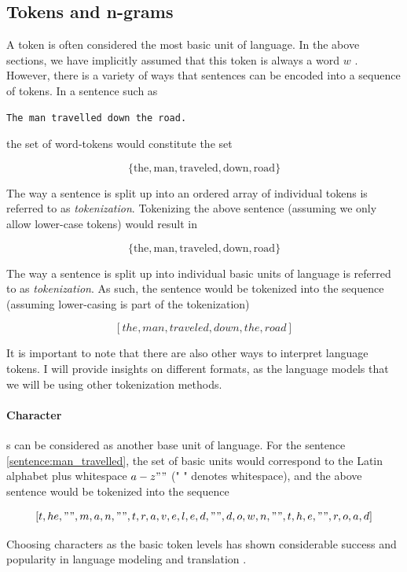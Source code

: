 \documentclass[a4paper,12pt,twoside,openright]{report}
\begin{document}
\subsection{Tokens and n-grams}

A token is often considered the most basic unit of language.
In the above sections, we have implicitly assumed that this token is always a word $w$ . 
However, there is a variety of ways that sentences can be encoded into a sequence of tokens.
In a sentence such as

\begin{verbatim}
The man travelled down the road.
\end{verbatim}\label{sentence:man_travelled}

the set of word-tokens would constitute the set

$$
\{ \text{the}, \text{man}, \text{traveled}, \text{down}, \text{road} \}
$$

The way a sentence is split up into an ordered array of individual tokens is referred to as \textit{tokenization}.
Tokenizing the above sentence (assuming we only allow lower-case tokens) would result in 

$$
\{ \text{the}, \text{man}, \text{traveled}, \text{down}, \text{road} \}
$$

The way a sentence is split up into individual basic units of language is referred to as \textit{tokenization}.
As such, the sentence would be tokenized into the sequence (assuming lower-casing is part of the tokenization)

$$
[the, man, traveled, down, the, road]
$$

It is important to note that there are also other ways to interpret language tokens. 
I will provide insights on different formats, as the language models that we will be using other tokenization methods.

\paragraph{Character}s can be considered as another base unit of language.
For the sentence \eqref{sentence:man_travelled}, the set of basic units would correspond to the Latin alphabet plus whitespace $a - z" "$ (" " denotes whitespace), and the above sentence would be tokenized into the sequence 

$$
[t, h e, " ", m, a, n, " ", t, r, a, v, e, l, e, d, " ", d, o, w, n, " ", t, h, e, " ", r, o, a, d]
$$

Choosing characters as the basic token levels has shown considerable success and popularity in language modeling \cite{sutskever11} and translation \cite{lee17}.
\end{document}
